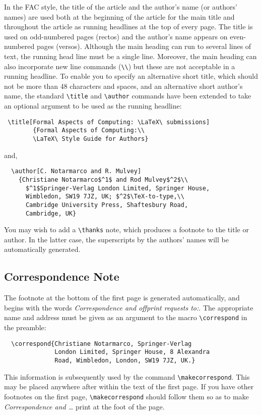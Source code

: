 In the FAC style, the title of the article and the author's name (or
authors' names) are used both at the beginning of the article for the main
title and throughout the article as running headlines at the top of every
page.
The title is used on odd-numbered pages (rectos) and the author's name
appears on even-numbered pages (versos).
Although the main heading can run to several lines of text, the running
head line must be a single line.
Moreover, the main heading can also incorporate new line commands
(\eg \verb"\\") but these are not acceptable in a running headline.
To enable you to specify an alternative short title, which should not be
more than 48 characters and spaces, and an alternative short author's name,
the standard \verb"\title" and \verb"\author" commands have been extended
to take an optional argument to be used as the running headline:
%
\begin{verbatim}
 \title[Formal Aspects of Computing: \LaTeX\ submissions]
        {Formal Aspects of Computing:\\
        \LaTeX\ Style Guide for Authors}
\end{verbatim}
and,
\begin{verbatim}
  \author[C. Notarmarco and R. Mulvey]
    {Christiane Notarmarco$^1$ and Rod Mulvey$^2$\\
      $^1$Springer-Verlag London Limited, Springer House,
      Wimbledon, SW19 7JZ, UK; $^2$\TeX-to-type,\\
      Cambridge University Press, Shaftesbury Road,
      Cambridge, UK}
\end{verbatim}

You may wish to add a \verb"\thanks" note, which produces a footnote to the
title or author. In the latter case, the superscripts by the authors' names
will be automatically generated.

\subsection{Correspondence Note}

The footnote at the bottom of the first page is generated automatically,
and begins with the words {\it Correspondence and offprint
requests to\/{\rm:\visiblespace }}.
The appropriate name and address must be given as an argument to the macro
\verb"\correspond" in the preamble:
%
\begin{verbatim}
  \correspond{Christiane Notarmarco, Springer-Verlag
              London Limited, Springer House, 8 Alexandra
              Road, Wimbledon, London, SW19 7JZ, UK.}
\end{verbatim}
%
This information is subsequently used by the command
\verb"\makecorrespond". This may be placed anywhere
after \verb""  within the text of the first page. If you
have other footnotes on the first page, \verb"\makecorrespond" should
follow them so as to make {\em Correspondence and \ldots} print at the foot
of the page.

